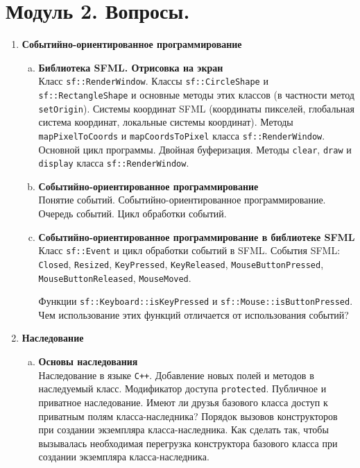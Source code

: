 \documentclass{article}
\begin{document}

\section*{Модуль 2. Вопросы.}
\begin{enumerate}

\item \textbf{Событийно-ориентированное программирование}
\begin{enumerate}[a.]
\item \textbf{Библиотека SFML. Отрисовка на экран}\\
Класс \texttt{sf::RenderWindow}. Классы \texttt{sf::CircleShape} и \texttt{sf::RectangleShape} и основные методы этих классов (в частности метод \texttt{setOrigin}). Системы координат SFML (координаты пикселей, глобальная система координат, локальные системы координат). Методы \texttt{mapPixelToCoords} и \texttt{mapCoordsToPixel} класса \texttt{sf::RenderWindow}. Основной цикл программы. Двойная буферизация. Методы \texttt{clear}, \texttt{draw} и \texttt{display} класса \texttt{sf::RenderWindow}. 

\item \textbf{Событийно-ориентированное программирование}\\
Понятие событий. Событийно-ориентированное программирование. Очередь событий. Цикл обработки событий.

\item \textbf{Событийно-ориентированное программирование в библиотеке SFML}\\
Класс \texttt{sf::Event} и цикл обработки событий в SFML.
События SFML: \texttt{Closed}, \texttt{Resized}, \texttt{KeyPressed}, \texttt{KeyReleased}, \texttt{MouseButtonPressed},  \texttt{MouseButtonReleased}, \texttt{MouseMoved}.

Функции \texttt{sf::Keyboard::isKeyPressed} и \texttt{sf::Mouse::isButtonPressed}. Чем использование этих функций отличается от использования событий?
\end{enumerate}





\item \textbf{Наследование}
\begin{enumerate}[a.]
\item \textbf{Основы наследования}\\
Наследование в языке \texttt{C++}. Добавление новых полей и методов в наследуемый класс. Модификатор доступа \texttt{protected}. Публичное и приватное наследование. Имеют ли друзья базового класса доступ к приватным полям класса-наследника? 
Порядок вызовов конструкторов при создании экземпляра класса-наследника. Как сделать так, чтобы вызывалась необходимая перегрузка конструктора базового класса при создании экземпляра класса-наследника.


\end{enumerate}
\end{enumerate}
\end{document}
